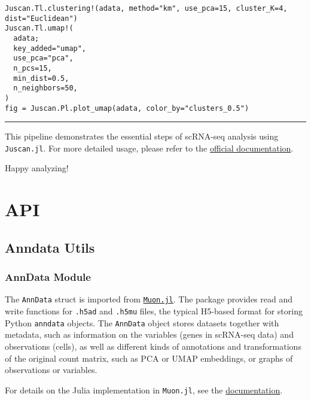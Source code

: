 \documentclass[oneside]{memoir}
\begin{document}
\label{4391682998113665460}{}



\begin{verbatim}
Juscan.Tl.clustering!(adata, method="km", use_pca=15, cluster_K=4, dist="Euclidean")
Juscan.Tl.umap!(
  adata;
  key_added="umap",
  use_pca="pca",
  n_pcs=15,
  min_dist=0.5,
  n_neighbors=50,
)
fig = Juscan.Pl.plot_umap(adata, color_by="clusters_0.5")
\end{verbatim}



{\rule{\textwidth}{1pt}}


This pipeline demonstrates the essential steps of scRNA-seq analysis using \texttt{Juscan.jl}. For more detailed usage, please refer to the \href{https://zehua0417.github.io/Juscan.jl/}{official documentation}.



Happy analyzing! 🧬✨



\part{API}


\chapter{Anndata Utils}


\section{AnnData Module}



\label{4706097015300978284}{}


The \texttt{AnnData} struct is imported from \href{https://github.com/scverse/Muon.jl}{\texttt{Muon.jl}}. The package provides read and write functions for \texttt{.h5ad} and \texttt{.h5mu} files, the typical H5-based format for storing Python \texttt{anndata} objects. The \texttt{AnnData} object stores datasets together with metadata, such as information on the variables (genes in scRNA-seq data) and observations (cells), as well as different kinds of annotations and transformations of the original count matrix, such as PCA or UMAP embeddings, or graphs of observations or variables.



For details on the Julia implementation in \texttt{Muon.jl}, see the \href{https://scverse.github.io/Muon.jl/dev/}{documentation}.
\end{document}
